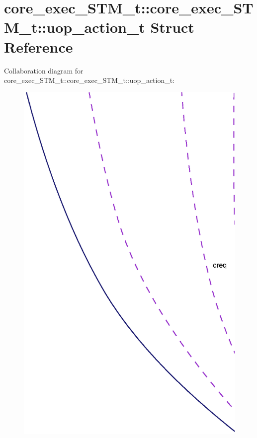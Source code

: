 \section{core\_\-exec\_\-STM\_\-t::core\_\-exec\_\-STM\_\-t::uop\_\-action\_\-t Struct Reference}
\label{structcore__exec__STM__t_1_1uop__action__t}
Collaboration diagram for core\_\-exec\_\-STM\_\-t::core\_\-exec\_\-STM\_\-t::uop\_\-action\_\-t:\nopagebreak
\begin{figure}[H]
\begin{center}
\leavevmode
\includegraphics[width=400pt]{structcore__exec__STM__t_1_1uop__action__t__coll__graph}
\end{center}
\end{figure}

